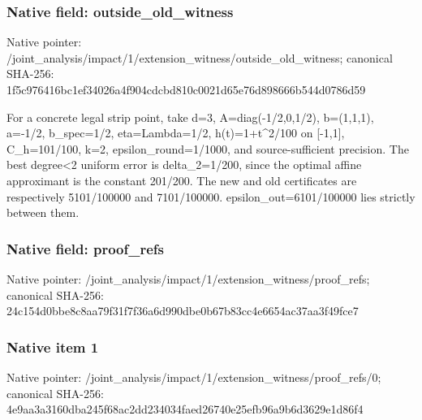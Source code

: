 \documentclass[10pt,a4paper]{article}
\begin{document}
\subsubsection{Native field: outside\_\allowbreak{}old\_\allowbreak{}witness}
Native pointer: /joint\_\allowbreak{}analysis/impact/1/extension\_\allowbreak{}witness/outside\_\allowbreak{}old\_\allowbreak{}witness; canonical SHA-256: 1f5c976416bc1ef34026a4f904cdcbd810c0021d65e76d898666b544d0786d59

\begingroup\raggedright\sloppy For a concrete legal strip point,\allowbreak{} take d=\allowbreak{}3,\allowbreak{} A=\allowbreak{}diag(-1/\allowbreak{}2,\allowbreak{}0,\allowbreak{}1/\allowbreak{}2),\allowbreak{} b=\allowbreak{}(1,\allowbreak{}1,\allowbreak{}1),\allowbreak{} a=\allowbreak{}-1/\allowbreak{}2,\allowbreak{} b\_\allowbreak{}spec=\allowbreak{}1/\allowbreak{}2,\allowbreak{} eta=\allowbreak{}Lambda=\allowbreak{}1/\allowbreak{}2,\allowbreak{} h(t)=\allowbreak{}1+t\textasciicircum{}2/\allowbreak{}100 on [-1,\allowbreak{}1],\allowbreak{} C\_\allowbreak{}h=\allowbreak{}101/\allowbreak{}100,\allowbreak{} k=\allowbreak{}2,\allowbreak{} epsilon\_\allowbreak{}round=\allowbreak{}1/\allowbreak{}1000,\allowbreak{} and source-sufficient precision. The best degree<2 uniform error is delta\_\allowbreak{}2=\allowbreak{}1/\allowbreak{}200,\allowbreak{} since the optimal affine approximant is the constant 201/\allowbreak{}200. The new and old certificates are respectively 5101/\allowbreak{}100000 and 7101/\allowbreak{}100000. epsilon\_\allowbreak{}out=\allowbreak{}6101/\allowbreak{}100000 lies strictly between them.\par\endgroup

\subsubsection{Native field: proof\_\allowbreak{}refs}
Native pointer: /joint\_\allowbreak{}analysis/impact/1/extension\_\allowbreak{}witness/proof\_\allowbreak{}refs; canonical SHA-256: 24c154d0bbe8c8aa79f31f7f36a6d990dbe0b67b83cc4e6654ac37aa3f49fce7

\subsubsection{Native item 1}
Native pointer: /joint\_\allowbreak{}analysis/impact/1/extension\_\allowbreak{}witness/proof\_\allowbreak{}refs/0; canonical SHA-256: 4e9aa3a3160dba245f68ac2dd234034faed26740e25efb96a9b6d3629e1d86f4
\end{document}
